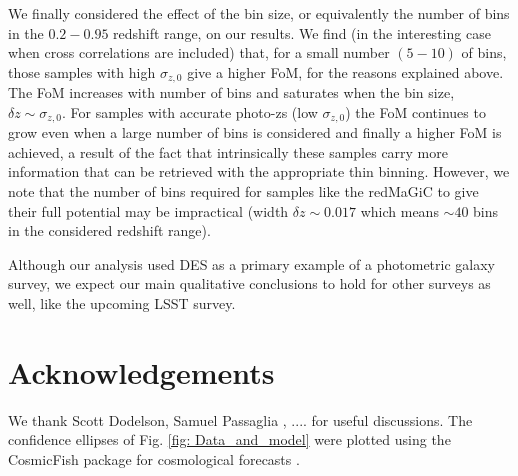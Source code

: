 \documentclass[a4paper,fleqn,usenatbib]{mnras}
\begin{document}
We finally considered the effect  of the bin size, or equivalently the number of bins in the $0.2 - 0.95$ redshift range, on our results. We find (in the interesting case when cross correlations are included) that, for a small number $(5-10)$ of bins, those samples with high $\sigma_{z,0}$ give a higher FoM, for the reasons explained above. The FoM increases with number of bins and saturates when the bin size, $\delta z \sim \sigma_{z,0}$. For samples with accurate photo-zs (low $\sigma_{z,0}$) the FoM continues to grow even when a large number of bins is considered and finally a higher FoM is achieved, a result of the fact that intrinsically these samples carry more information that can be retrieved with the appropriate thin binning. However, we note that the number of bins required for samples like the redMaGiC to give their full potential may be impractical (width $\delta z \sim 0.017$ which means $\sim 40$ bins in the considered redshift range).

Although our analysis used DES as a primary example of a photometric galaxy survey, we expect our main qualitative conclusions to hold for other surveys as well, like the upcoming LSST survey.


\section*{Acknowledgements}

We thank Scott Dodelson, Samuel Passaglia , .... for useful discussions.
The confidence ellipses of Fig. \ref{fig: Data_and_model} were plotted using the CosmicFish package for cosmological forecasts \citep{Raveri2016}.



%
\end{document}
